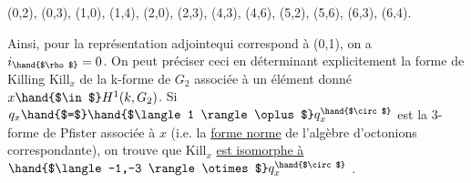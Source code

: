 (0,2), (0,3), (1,0), (1,4), (2,0), (2,3), (4,3), (4,6), (5,2), (5,6),
(6,3), (6,4).

Ainsi, pour la représentation adjointe\hand{,}qui correspond à (0,1), on
a $i_{\hand{$\rho$}} = 0$. On peut préciser ceci en déterminant explicitement la forme
de Killing $\mathrm{Kill}_x$ de la k-forme de $G_2$ associée à un élément donné
$x \hand{$\in$} H^1(k, G_2)$. Si $q_x \hand{$=$} \hand{$\langle 1 \rangle \oplus$} q_x^{\hand{$\circ$}}$ est la 3-forme de Pfister associée à $x$
(i.e. la \uline{forme norme} de l'algèbre d'octonions correspondante), on trouve
que $\mathrm{Kill}_x$ \uline{est isomorphe à} $\hand{$\langle -1,-3 \rangle \otimes$} q_x^{\hand{$\circ$}}$ .

